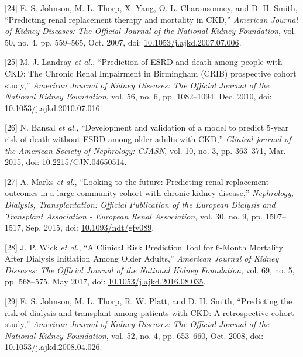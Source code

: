 \documentclass[12pt,PhD,twoside,openright]{muthesis}
\newenvironment{cslreferences}%
  {}%
  {\par}
\begin{document}
\begin{cslreferences}
\leavevmode\hypertarget{ref-johnson_predicting_2007}{}%
{[}24{]} E. S. Johnson, M. L. Thorp, X. Yang, O. L. Charansonney, and D. H. Smith, ``Predicting renal replacement therapy and mortality in CKD,'' \emph{American Journal of Kidney Diseases: The Official Journal of the National Kidney Foundation}, vol. 50, no. 4, pp. 559--565, Oct. 2007, doi: \href{https://doi.org/10.1053/j.ajkd.2007.07.006}{10.1053/j.ajkd.2007.07.006}.

\leavevmode\hypertarget{ref-landray_prediction_2010}{}%
{[}25{]} M. J. Landray \emph{et al.}, ``Prediction of ESRD and death among people with CKD: The Chronic Renal Impairment in Birmingham (CRIB) prospective cohort study,'' \emph{American Journal of Kidney Diseases: The Official Journal of the National Kidney Foundation}, vol. 56, no. 6, pp. 1082--1094, Dec. 2010, doi: \href{https://doi.org/10.1053/j.ajkd.2010.07.016}{10.1053/j.ajkd.2010.07.016}.

\leavevmode\hypertarget{ref-bansal_development_2015}{}%
{[}26{]} N. Bansal \emph{et al.}, ``Development and validation of a model to predict 5-year risk of death without ESRD among older adults with CKD,'' \emph{Clinical journal of the American Society of Nephrology: CJASN}, vol. 10, no. 3, pp. 363--371, Mar. 2015, doi: \href{https://doi.org/10.2215/CJN.04650514}{10.2215/CJN.04650514}.

\leavevmode\hypertarget{ref-marks_looking_2015}{}%
{[}27{]} A. Marks \emph{et al.}, ``Looking to the future: Predicting renal replacement outcomes in a large community cohort with chronic kidney disease,'' \emph{Nephrology, Dialysis, Transplantation: Official Publication of the European Dialysis and Transplant Association - European Renal Association}, vol. 30, no. 9, pp. 1507--1517, Sep. 2015, doi: \href{https://doi.org/10.1093/ndt/gfv089}{10.1093/ndt/gfv089}.

\leavevmode\hypertarget{ref-wick_clinical_2017}{}%
{[}28{]} J. P. Wick \emph{et al.}, ``A Clinical Risk Prediction Tool for 6-Month Mortality After Dialysis Initiation Among Older Adults,'' \emph{American Journal of Kidney Diseases: The Official Journal of the National Kidney Foundation}, vol. 69, no. 5, pp. 568--575, May 2017, doi: \href{https://doi.org/10.1053/j.ajkd.2016.08.035}{10.1053/j.ajkd.2016.08.035}.

\leavevmode\hypertarget{ref-johnson_predicting_2008}{}%
{[}29{]} E. S. Johnson, M. L. Thorp, R. W. Platt, and D. H. Smith, ``Predicting the risk of dialysis and transplant among patients with CKD: A retrospective cohort study,'' \emph{American Journal of Kidney Diseases: The Official Journal of the National Kidney Foundation}, vol. 52, no. 4, pp. 653--660, Oct. 2008, doi: \href{https://doi.org/10.1053/j.ajkd.2008.04.026}{10.1053/j.ajkd.2008.04.026}.


\end{cslreferences}
\end{document}

